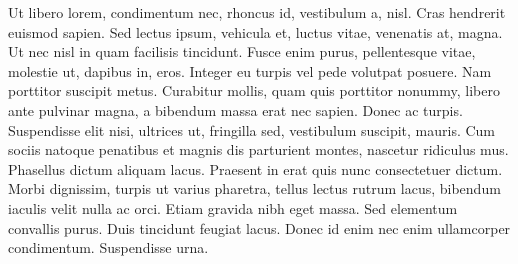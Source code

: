 Ut libero lorem, condimentum nec, rhoncus id, vestibulum a, nisl. Cras hendrerit euismod sapien. Sed lectus ipsum, vehicula et, luctus vitae, venenatis at, magna. Ut nec nisl in quam facilisis tincidunt. Fusce enim purus, pellentesque vitae, molestie ut, dapibus in, eros. Integer eu turpis vel pede volutpat posuere. Nam porttitor suscipit metus. Curabitur mollis, quam quis porttitor nonummy, libero ante pulvinar magna, a bibendum massa erat nec sapien. Donec ac turpis. Suspendisse elit nisi, ultrices ut, fringilla sed, vestibulum suscipit, mauris. Cum sociis natoque penatibus et magnis dis parturient montes, nascetur ridiculus mus. Phasellus dictum aliquam lacus. Praesent in erat quis nunc consectetuer dictum. Morbi dignissim, turpis ut varius pharetra, tellus lectus rutrum lacus, bibendum iaculis velit nulla ac orci. Etiam gravida nibh eget massa. Sed elementum convallis purus. Duis tincidunt feugiat lacus. Donec id enim nec enim ullamcorper condimentum. Suspendisse urna.
